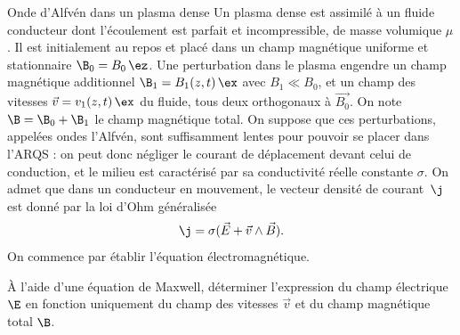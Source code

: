 \begin{exo}[PC][3][colle]{Onde d'Alfvén dans un plasma dense}
 Un plasma dense est assimilé à un fluide conducteur dont l'écoulement est parfait et incompressible, de masse volumique $\mu$. Il est initialement au repos et placé dans un champ magnétique uniforme et stationnaire $\B_0 = B_0 \,\ez$. Une perturbation dans le plasma engendre un champ magnétique additionnel $\B_1=B_1(z,t)\,\ex$ avec $B_1 \ll B_0$, et un champ des vitesses $\Vec{v}=v_1(z,t)\,\ex$ du fluide, tous deux orthogonaux à $\Vec{B_0}$. On note $\B = \B_0 + \B_1$ le champ magnétique total. On suppose que ces perturbations, appelées ondes l'Alfvén, sont suffisamment lentes pour pouvoir se placer dans l'ARQS : on peut donc négliger le courant de déplacement devant celui de conduction, et le milieu est caractérisé par sa conductivité réelle constante $\sigma$. On admet que dans un conducteur en mouvement, le vecteur densité de courant~$\j$ est donné par la loi d'Ohm généralisée 
 \begin{equation}
 \j = \sigma(\Vec{E}+\Vec{v}\wedge \Vec{B}).
\end{equation}
On commence par établir l'équation électromagnétique.
    \begin{quest}
        \item 
        À l'aide d'une équation de Maxwell, déterminer l'expression du champ électrique $\E$ en fonction uniquement du champ des vitesses $\Vec{v}$ et du champ magnétique total $\B$.




\end{quest}
\end{exo}
